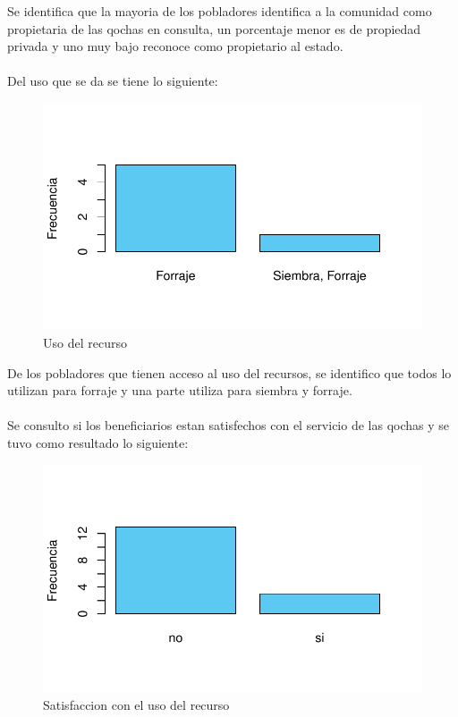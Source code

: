 \documentclass[12pt]{article}\usepackage[]{graphicx}\usepackage[]{xcolor}
\makeatletter
\def\maxwidth{ %
  \ifdim\Gin@nat@width>\linewidth
    \linewidth
  \else
    \Gin@nat@width
  \fi
}
\newenvironment{knitrout}{}{} %
\makeatother
\begin{document}
	Se identifica que la mayoria de los pobladores identifica a la comunidad como propietaria de las qochas en consulta, un porcentaje menor es de propiedad privada y uno muy bajo reconoce como propietario al estado.\\
	\\
	Del uso que se da se tiene lo siguiente:
	\begin{figure}[H]
	\centering
\begin{knitrout}
\color{fgcolor}
\includegraphics[width=\maxwidth]{figure/quince-1} 
\end{knitrout}
	\caption{Uso del recurso}
	\end{figure}
	De los pobladores que tienen acceso al uso del recursos, se identifico que todos lo utilizan para forraje y una parte utiliza para siembra y forraje.\\
	\\
	Se consulto si los beneficiarios estan satisfechos con el servicio de las qochas y se tuvo como resultado lo siguiente:
	\begin{figure}[H]
	\centering
\begin{knitrout}
\color{fgcolor}
\includegraphics[width=\maxwidth]{figure/dieciseis-1} 
\end{knitrout}
	\caption{Satisfaccion con el uso del recurso}
	\end{figure}
\end{document}
